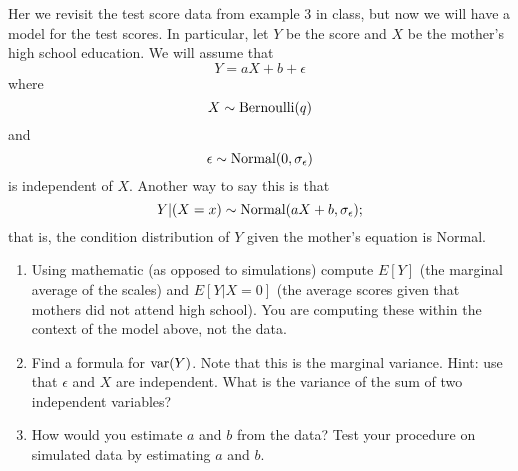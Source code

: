 \begin{exercise}
Her we revisit the test score data from example 3 in class, but now we will have a model for the test scores. In particular, let $Y$ be the score and $X$ be the mother's high school education. We will assume that  
\begin{equation*}
Y = a X + b + \epsilon
\end{equation*}
where 
\begin{equation*}
X \sim {\rm Bernoulli}(q)
\end{equation*}
and 
\begin{equation*}
\epsilon \sim {\rm Normal}(0,\sigma_{\epsilon})
\end{equation*}
is independent of $X$. 
Another way to say this is that 
\begin{equation*}
Y|(X=x) \sim {\rm Normal}(aX+b,\sigma_{\epsilon});
\end{equation*}
that is, the condition distribution of $Y$ given the mother's equation is Normal. 

\begin{enumerate}[label=(\alph*)]
\item Using mathematic (as opposed to simulations) compute $E[Y]$ (the marginal average of the scales) and $E[Y|X=0]$ (the average scores given that mothers did not attend high school). You are computing these within the context of the model above, not the data. 
\item Find a formula for ${\rm var}(Y)$.  Note that this is the marginal variance. Hint: use that $\epsilon$ and $X$ are independent. What is the variance of the sum of two independent variables? 
\item How would you estimate $a$ and $b$ from the data?  Test your procedure on simulated data by estimating $a$ and $b$. 
\end{enumerate}
\end{exercise}





